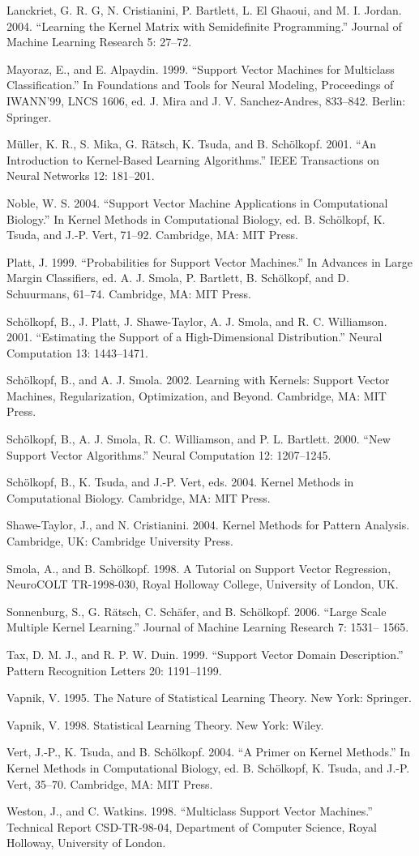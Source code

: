 Lanckriet, G. R. G, N. Cristianini, P. Bartlett, L. El Ghaoui, and M. I. Jordan. 2004. “Learning the Kernel Matrix with Semidefinite Programming.” Journal of Machine Learning Research 5: 27--72.

Mayoraz, E., and E. Alpaydin. 1999. “Support Vector Machines for Multiclass Classification.” In Foundations and Tools for Neural Modeling, Proceedings of IWANN’99, LNCS 1606, ed. J. Mira and J. V. Sanchez-Andres, 833--842. Berlin: Springer.

Müller, K. R., S. Mika, G. Rätsch, K. Tsuda, and B. Schölkopf. 2001. “An Introduction to Kernel-Based Learning Algorithms.” IEEE Transactions on Neural Networks 12: 181--201.

Noble, W. S. 2004. “Support Vector Machine Applications in Computational Biology.” In Kernel Methods in Computational Biology, ed. B. Schölkopf, K. Tsuda, and J.-P. Vert, 71--92. Cambridge, MA: MIT Press.

Platt, J. 1999. “Probabilities for Support Vector Machines.” In Advances in Large Margin Classifiers, ed. A. J. Smola, P. Bartlett, B. Schölkopf, and D. Schuurmans, 61--74. Cambridge, MA: MIT Press.

Schölkopf, B., J. Platt, J. Shawe-Taylor, A. J. Smola, and R. C. Williamson. 2001. “Estimating the Support of a High-Dimensional Distribution.” Neural Computation 13: 1443--1471.

Schölkopf, B., and A. J. Smola. 2002. Learning with Kernels: Support Vector Machines, Regularization, Optimization, and Beyond. Cambridge, MA: MIT Press.

Schölkopf, B., A. J. Smola, R. C. Williamson, and P. L. Bartlett. 2000. “New Support Vector Algorithms.” Neural Computation 12: 1207--1245.

Schölkopf, B., K. Tsuda, and J.-P. Vert, eds. 2004. Kernel Methods in Computational Biology. Cambridge, MA: MIT Press.

Shawe-Taylor, J., and N. Cristianini. 2004. Kernel Methods for Pattern Analysis. Cambridge, UK: Cambridge University Press.

Smola, A., and B. Schölkopf. 1998. A Tutorial on Support Vector Regression, NeuroCOLT TR-1998-030, Royal Holloway College, University of London, UK.

Sonnenburg, S., G. Rätsch, C. Schäfer, and B. Schölkopf. 2006. “Large Scale Multiple Kernel Learning.” Journal of Machine Learning Research 7: 1531-- 1565.

Tax, D. M. J., and R. P. W. Duin. 1999. “Support Vector Domain Description.” Pattern Recognition Letters 20: 1191--1199.

Vapnik, V. 1995. The Nature of Statistical Learning Theory. New York: Springer.

Vapnik, V. 1998. Statistical Learning Theory. New York: Wiley.

Vert, J.-P., K. Tsuda, and B. Schölkopf. 2004. “A Primer on Kernel Methods.” In Kernel Methods in Computational Biology, ed. B. Schölkopf, K. Tsuda, and J.-P. Vert, 35--70. Cambridge, MA: MIT Press.

Weston, J., and C. Watkins. 1998. “Multiclass Support Vector Machines.” Technical Report CSD-TR-98-04, Department of Computer Science, Royal Holloway, University of London.
